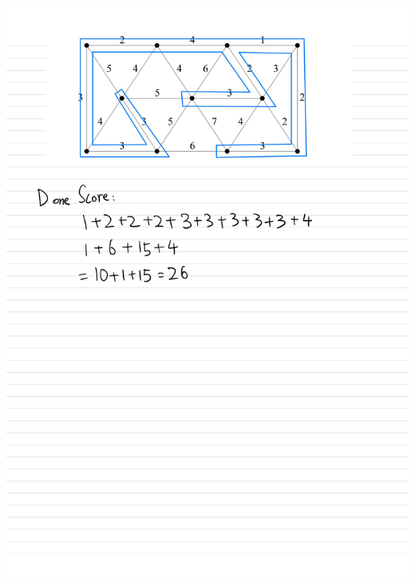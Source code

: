 \documentclass[]{article}
\theoremstyle{definition}
\begin{document}
    \begin{center}
        \includegraphics[width=14cm]{HW1-7.jpg}
    \end{center}
\end{document}
